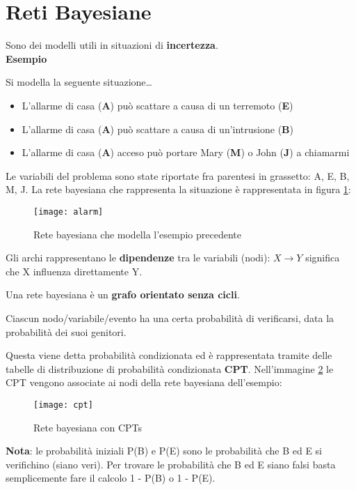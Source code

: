 \newpage

\section{Reti Bayesiane}

Sono dei modelli utili in situazioni di \textbf{incertezza}.\\

\textbf{Esempio}

Si modella la seguente situazione\dots

\begin{itemize}
\item L'allarme di casa (\textbf{A}) può scattare a causa di un terremoto (\textbf{E})
\item L'allarme di casa (\textbf{A}) può scattare a causa di un'intrusione (\textbf{B})
\item L'allarme di casa (\textbf{A}) acceso può portare Mary (\textbf{M}) o John (\textbf{J}) a chiamarmi
\end{itemize}

Le variabili del problema sono state riportate fra parentesi in grassetto: A, E, B, M, J.
La rete bayesiana che rappresenta la situazione è rappresentata in figura \ref{fig:alarm}:

\begin{figure}[H]
\centering
\texttt{[image: alarm]}
\caption{Rete bayesiana che modella l'esempio precedente}
\label{fig:alarm}
\end{figure}

Gli archi rappresentano le \textbf{dipendenze} tra le variabili (nodi): $X \rightarrow Y$ significa che X influenza direttamente Y.

Una rete bayesiana è un \textbf{grafo orientato senza cicli}.

Ciascun nodo/variabile/evento ha una certa probabilità di verificarsi, data la probabilità dei suoi genitori.

Questa viene detta probabilità condizionata ed è rappresentata tramite delle tabelle di distribuzione di probabilità condizionata \textbf{CPT}. Nell'immagine \ref{fig:cpt} le CPT vengono associate ai nodi della rete bayesiana dell'esempio:

\begin{figure}[H]
\centering
\texttt{[image: cpt]}
\caption{Rete bayesiana con CPTs}
\label{fig:cpt}
\end{figure}

\textbf{Nota}: le probabilità iniziali P(B) e P(E) sono le probabilità che B ed E si verifichino (siano veri). Per trovare le probabilità che B ed E siano falsi basta semplicemente fare il calcolo 1 - P(B) o 1 - P(E).\\

